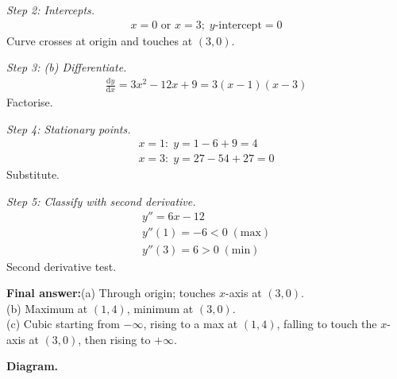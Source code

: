 \documentclass[11pt]{article}
\begin{document}
\textit{Step 2: Intercepts.}
\[\begin{gathered}
x = 0 \text{ or } x = 3; \; y\text{-intercept} = 0
\end{gathered}\]
Curve crosses at origin and touches at \( (3, 0) \).

\textit{Step 3: (b) Differentiate.}
\[\begin{gathered}
\frac{\mathrm{d}y}{\mathrm{d}x} = 3x^2 - 12x + 9 = 3(x - 1)(x - 3)
\end{gathered}\]
Factorise.

\textit{Step 4: Stationary points.}
\[\begin{gathered}
x = 1: \; y = 1 - 6 + 9 = 4 \\ x = 3: \; y = 27 - 54 + 27 = 0
\end{gathered}\]
Substitute.

\textit{Step 5: Classify with second derivative.}
\[\begin{gathered}
y'' = 6x - 12 \\ y''(1) = -6 < 0\; (\text{max}) \\ y''(3) = 6 > 0\; (\text{min})
\end{gathered}\]
Second derivative test.

\begin{answerbox}
\textbf{Final answer:}\quad (a) Through origin; touches \(\displaystyle  x \)-axis at \(\displaystyle  (3, 0) \). \\[3pt]  (b) Maximum at \(\displaystyle  (1, 4) \), minimum at \(\displaystyle  (3, 0) \). \\[3pt]  (c) Cubic starting from \(\displaystyle  -\infty \), rising to a max at \(\displaystyle  (1, 4) \), falling to touch the \(\displaystyle  x \)-axis at \(\displaystyle  (3, 0) \), then rising to \(\displaystyle  +\infty \).
\end{answerbox}
\textbf{Diagram.}
\end{document}
